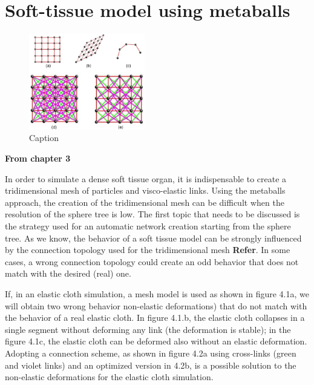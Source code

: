 \documentclass[journal]{vgtc}                %
\begin{document}
\section{Soft-tissue model using metaballs}

\begin{figure}[!b]
    \centering
    \includegraphics[width=0.45\textwidth]{Figures/Fig1.eps}
    \caption{Caption}
    \label{fig:fig1}
\end{figure}
\textbf{From chapter 3}

In order to simulate a dense soft tissue organ, it is indispensable to create a tridimensional mesh of particles and visco-elastic links.
Using the metaballs approach, the creation of the tridimensional mesh can be
difficult when the resolution of the sphere tree is low. The first topic that needs to be
discussed is the strategy used for an automatic network creation starting from the
sphere tree. As we know, the behavior of a soft tissue model can be strongly
influenced by the connection topology used for the tridimensional mesh \textbf{Refer}. In some
cases, a wrong connection topology could create an odd behavior that does not match with the desired (real) one.




If, in an elastic cloth simulation, a mesh model is used as shown in figure 4.1a, we
will obtain two wrong behavior non-elastic deformations) that do not match with the
behavior of a real elastic cloth. In figure 4.1.b, the elastic cloth collapses in a single
segment without deforming any link (the deformation is stable); in the figure 4.1c,
the elastic cloth can be deformed also without an elastic deformation. Adopting a
connection scheme, as shown in figure 4.2a using cross-links (green and violet links)
and an optimized version in 4.2b, is a possible solution to the non-elastic
deformations for the elastic cloth simulation.
\end{document}
